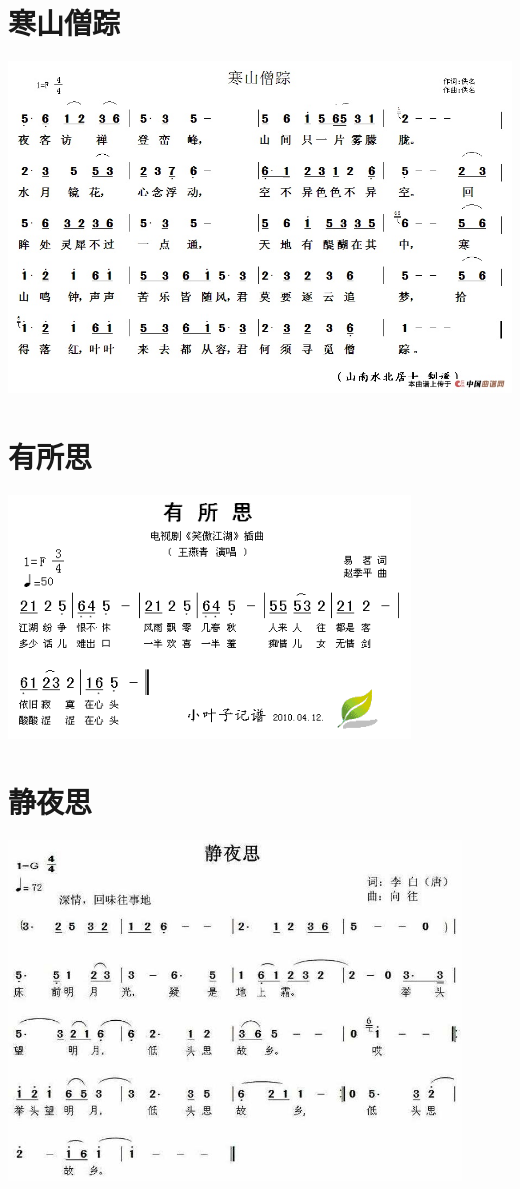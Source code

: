 \documentclass[cn,pad,chinesefont=nofont,twocol]{elegantbook}
\begin{document}
\section{寒山僧踪}
	\includegraphics[width=\textwidth]{dongxiao/20200710-寒山僧踪.jpg}  
\section{有所思}
    \includegraphics[width=0.8\textwidth]{dongxiao/20200710-有所思}
\section{静夜思}
    \includegraphics[width=0.9\textwidth]{dongxiao/20200411-静夜思}
 
\end{document}
